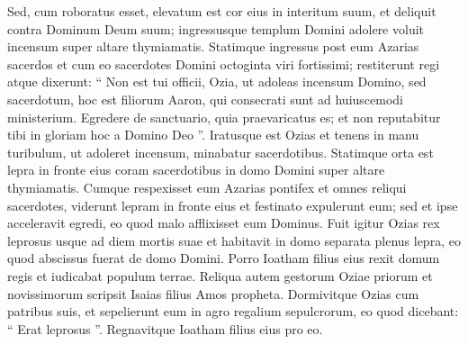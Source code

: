 \begin{biblechapter}
\begin{biblechapter}
\begin{biblechapter}
\begin{biblechapter}
\begin{biblechapter}
\begin{biblechapter}
\begin{biblechapter}
\begin{biblechapter}
\begin{biblechapter}
\begin{biblechapter}
\begin{biblechapter}
\begin{biblechapter}
\begin{biblechapter}
\begin{biblechapter}
\begin{biblechapter}
\begin{biblechapter}
\begin{biblechapter}
\begin{biblechapter}
\begin{biblechapter}
\begin{biblechapter}
\begin{biblechapter}
\begin{biblechapter}
\begin{biblechapter}
\begin{biblechapter}
\begin{biblechapter}
\begin{biblechapter}
 \verse Sed, cum roboratus esset, elevatum est cor eius in interitum suum, et deliquit contra Dominum Deum suum; ingressusque templum Domini adolere voluit incensum super altare thymiamatis. 
\verse Statimque ingressus post eum Azarias sacerdos et cum eo sacerdotes Domini octoginta viri fortissimi; 
\verse restiterunt regi atque dixerunt: “ Non est tui officii, Ozia, ut adoleas incensum Domino, sed sacerdotum, hoc est filiorum Aaron, qui consecrati sunt ad huiuscemodi ministerium. Egredere de sanctuario, quia praevaricatus es; et non reputabitur tibi in gloriam hoc a Domino Deo ”. 
\verse Iratusque est Ozias et tenens in manu turibulum, ut adoleret incensum, minabatur sacerdotibus. Statimque orta est lepra in fronte eius coram sacerdotibus in domo Domini super altare thymiamatis. 
\verse Cumque respexisset eum Azarias pontifex et omnes reliqui sacerdotes, viderunt lepram in fronte eius et festinato expulerunt eum; sed et ipse acceleravit egredi, eo quod malo afflixisset eum Dominus.
 \verse Fuit igitur Ozias rex leprosus usque ad diem mortis suae et habitavit in domo separata plenus lepra, eo quod abscissus fuerat de domo Domini. Porro Ioatham filius eius rexit domum regis et iudicabat populum terrae.
 \verse Reliqua autem gestorum Oziae priorum et novissimorum scripsit Isaias filius Amos propheta. 
\verse Dormivitque Ozias cum patribus suis, et sepelierunt eum in agro regalium sepulcrorum, eo quod dicebant: “ Erat leprosus ”. Regnavitque Ioatham filius eius pro eo.
 

\end{biblechapter}
\end{biblechapter}
\end{biblechapter}
\end{biblechapter}
\end{biblechapter}
\end{biblechapter}
\end{biblechapter}
\end{biblechapter}
\end{biblechapter}
\end{biblechapter}
\end{biblechapter}
\end{biblechapter}
\end{biblechapter}
\end{biblechapter}
\end{biblechapter}
\end{biblechapter}
\end{biblechapter}
\end{biblechapter}
\end{biblechapter}
\end{biblechapter}
\end{biblechapter}
\end{biblechapter}
\end{biblechapter}
\end{biblechapter}
\end{biblechapter}
\end{biblechapter}
